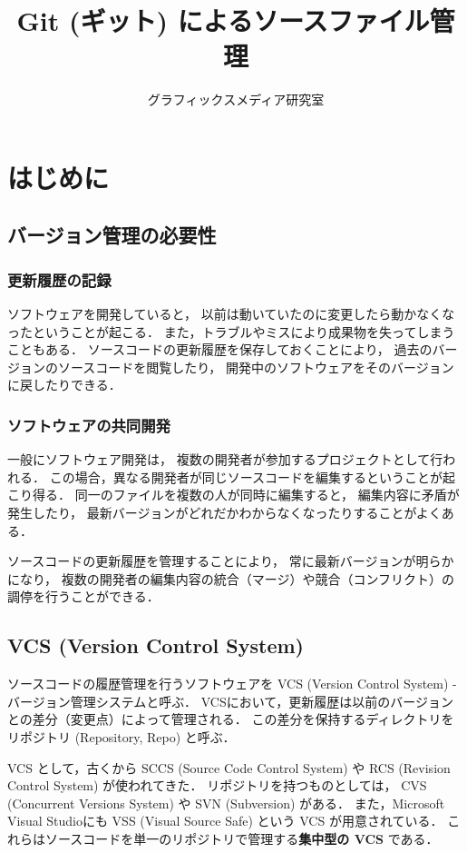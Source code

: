 \documentclass[a4j,10pt]{jarticle}
\title{\bf Git (ギット) によるソースファイル管理}
\author{グラフィックスメディア研究室}
\date{}
\begin{document}
\maketitle
\section{はじめに}

\subsection{バージョン管理の必要性}

\subsubsection{更新履歴の記録}
ソフトウェアを開発していると，
以前は動いていたのに変更したら動かなくなったということが起こる．
また，トラブルやミスにより成果物を失ってしまうこともある．
ソースコードの更新履歴を保存しておくことにより，
過去のバージョンのソースコードを閲覧したり，
開発中のソフトウェアをそのバージョンに戻したりできる．

\subsubsection{ソフトウェアの共同開発}
一般にソフトウェア開発は，
複数の開発者が参加するプロジェクトとして行われる．
この場合，異なる開発者が同じソースコードを編集するということが起こり得る．
同一のファイルを複数の人が同時に編集すると，
編集内容に矛盾が発生したり，
最新バージョンがどれだかわからなくなったりすることがよくある．

ソースコードの更新履歴を管理することにより，
常に最新バージョンが明らかになり，
複数の開発者の編集内容の統合（マージ）や競合（コンフリクト）の調停を行うことができる．

\subsection{VCS (Version Control System)}
ソースコードの履歴管理を行うソフトウェアを
VCS (Version Control System) - バージョン管理システムと呼ぶ．
VCSにおいて，更新履歴は以前のバージョンとの差分（変更点）によって管理される．
この差分を保持するディレクトリをリポジトリ (Repository, Repo) と呼ぶ．

VCS として，古くから SCCS (Source Code Control System) や
RCS (Revision Control System) が使われてきた．
リポジトリを持つものとしては，
CVS (Concurrent Versions System) や SVN (Subversion) がある．
また，Microsoft Visual Studioにも
VSS (Visual Source Safe) という VCS が用意されている．
これらはソースコードを単一のリポジトリで管理する{\bf 集中型の VCS} である．
\end{document}
